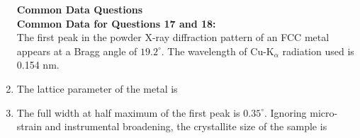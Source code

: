 \documentclass[journal]{IEEEtran}
\begin{document}
\begin{enumerate}
\textbf{Common Data Questions}\\

\textbf{Common Data for Questions 17 and 18:}\\
 The first peak in the powder X-ray diffraction pattern of an FCC metal appears at a Bragg angle of $19.2^{\circ}$. The wavelength of Cu-K$_{\alpha}$ radiation used is 0.154 nm.\\
\item The lattice parameter of the metal  is
\begin{enumerate}
\end{enumerate}


\item The full width at half maximum  of the first peak is $0.35^{\circ}$.
 Ignoring micro-strain and instrumental broadening, the crystallite size of the sample  is 
\begin{enumerate}
\end{enumerate}


\end{enumerate}
\end{document}
